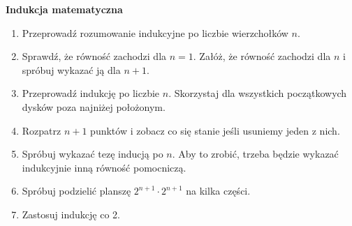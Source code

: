 \newpage
\begin{center}
	\textbf{Indukcja matematyczna}
\end{center}

\begin{enumerate}
	\item Przeprowadź rozumowanie indukcyjne po liczbie wierzchołków $n$.

	\item Sprawdź, że równość zachodzi dla $n = 1$. Załóż, że równość zachodzi dla $n$ i spróbuj wykazać ją dla $n + 1$.

	\item
	Przeprowadź indukcję po liczbie $n$. Skorzystaj dla wszystkich początkowych dysków poza najniżej położonym.

	\item Rozpatrz $n + 1$ punktów i zobacz co się stanie jeśli usuniemy jeden z nich.

	\item Spróbuj wykazać tezę inducją po $n$. Aby to zrobić, trzeba będzie wykazać indukcyjnie inną równość pomocniczą.

	\item Spróbuj podzielić planszę $2^{n + 1} \cdot 2^{n + 1}$ na kilka części.

	\item Zastosuj indukcję co 2.
\end{enumerate}